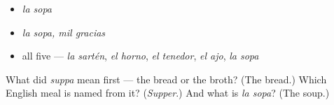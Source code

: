 \begin{itemize}
\raggedright
  \item \emph{la sopa}
  \item \emph{la sopa, mil gracias}
  \item all five — \emph{la sartén}, \emph{el horno}, \emph{el tenedor}, \emph{el ajo}, \emph{la sopa}
\end{itemize}

\begin{tcolorbox}[breakable,colback=teal!4,colframe=teal!35!black,title={Before you move on}]
What did \emph{suppa} mean first — the bread or the broth? (The bread.) Which English meal is named from it? (\emph{Supper}.) And what is \emph{la sopa}? (The soup.)
\end{tcolorbox}
